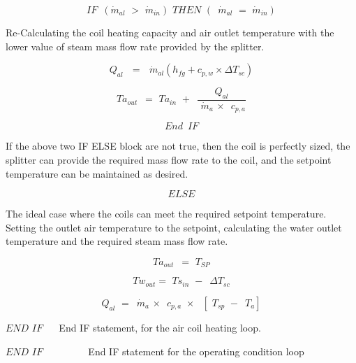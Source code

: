 \begin{equation}
IF\,\,\,({\dot m_{al}}\,\, > \,\,{\dot m_{in}})\,\,THEN\,\,(\,\,\,{\dot m_{al}}\,\, = \,\,{\dot m_{in}})
\end{equation}

Re-Calculating the coil heating capacity and air outlet temperature with the lower value of steam mass flow rate provided by the splitter.

\begin{equation}
{Q_{al}}\,\,\,\, = \,\,\,\,{\dot m_{al}}({h_{fg}} + {c_{p,w}} \times \Delta {T_{sc}})
\end{equation}

\begin{equation}
T{a_{out}}\,\,\, = \,\,T{a_{in}}\,\, + \,\,\,\frac{{{Q_{al}}}}{{\,\,{{\dot m}_a}\, \times \,\,\,{c_{p,a}}}}
\end{equation}

\begin{equation}
End\,\,\,IF
\end{equation}

If the above two IF ELSE block are not true, then the coil is perfectly sized, the splitter can provide the required mass flow rate to the coil, and the setpoint temperature can be maintained as desired.

\begin{equation}
ELSE
\end{equation}

The ideal case where the coils can meet the required setpoint temperature.~ Setting the outlet air temperature to the setpoint, calculating the water outlet temperature and the required steam mass flow rate.

\begin{equation}
T{a_{out}}\,\,\, = \,\,{T_{SP}}
\end{equation}

\begin{equation}
T{w_{out}} = \,\,T{s_{in}}\,\, - \,\,\,\Delta {T_{sc}}
\end{equation}

\begin{equation}
{Q_{al}}\,\, = \,\,\,{\dot m_a}\, \times \,\,\,{c_{p,a}}\,\, \times \,\,\,\,[\,\,{T_{sp}}\,\, - \,\,\,{T_a}]
\end{equation}

\(END\,\,IF\) ~~ End IF statement, for the air coil heating loop.

\(END\,\,IF\) ~~~~~~~~ End IF statement for the operating condition loop

